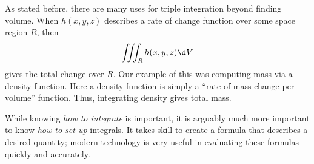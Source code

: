 \documentclass{ximera}
\begin{document}
As stated before, there are many uses for triple integration beyond
finding volume. When $h(x,y,z)$ describes a rate of change function
over some space region $R$, then
\[
\iiint_R h(x,y,z)\d V
\]
gives the total change over $R$. Our example of this was computing
mass via a density function. Here a density function is simply a
``rate of mass change per volume'' function. Thus, integrating density
gives total mass.

While knowing \textit{how to integrate} is important, it is arguably
much more important to know \textit{how to set up} integrals. It takes
skill to create a formula that describes a desired quantity; modern
technology is very useful in evaluating these formulas quickly and
accurately.
\end{document}

